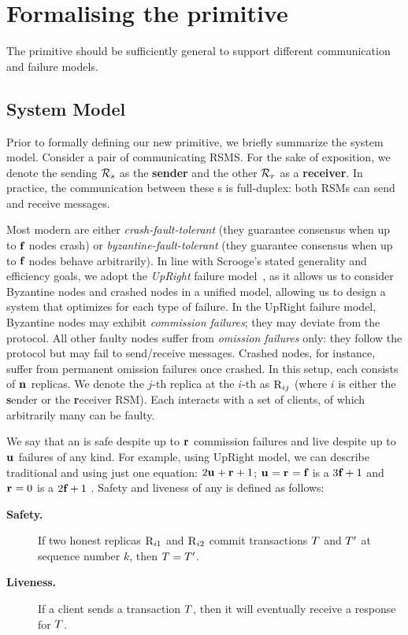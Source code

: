 \section{Formalising the \CCC{} primitive }
\label{s:prelim}
The \CCC{} primitive should be sufficiently general to support different communication and failure models. 

\subsection{System Model}

Prior to formally defining our new \CCC{} primitive, we briefly summarize the system model.
Consider a pair of communicating RSMS. For the sake of exposition,  we denote the sending \RSM{} $\mathcal{R}_{s}$ as the {\bf sender} and the other \RSM{} $\mathcal{R}_{r}$ as a {\bf receiver}. In practice, the communication between these \RSM{}s is full-duplex: both RSMs can send and receive messages.

Most modern  are either \textit{crash-fault-tolerant} (they guarantee consensus when up to $\textbf{f}_{}$ nodes crash) or \textit{byzantine-fault-tolerant} (they guarantee consensus when up to $\textbf{f}_{}$ nodes behave arbitrarily). In line with Scrooge's stated generality and efficiency goals, we adopt the \textit{UpRight} failure model~\cite{upright}, as it allows us to consider Byzantine nodes and crashed nodes in a unified model, allowing us to design a system that optimizes for each type of failure. In the UpRight failure model, Byzantine nodes may exhibit {\em commission failures}; they may deviate from the protocol. All other faulty nodes suffer from \textit{omission failures} only: they follow the protocol but may fail to send/receive messages. Crashed nodes, for instance, suffer from permanent omission failures once crashed.
In this setup, each \RSM{} consists of $\textbf{n}_{}$ replicas.  We denote the $j$-th replica at 
the $i$-th \RSM{} as $\textsc{R}_{{i}{j}}$ (where $i$ is either the \textbf{s}ender or the \textbf{r}eceiver RSM). Each \RSM{} interacts with a set of clients, of which arbitrarily many can be faulty.

We say that an \RSM{} is safe despite up to $\textbf{r}_{}$ commission failures and live despite up to $\textbf{u}_{}$ failures of any kind.
For example, using UpRight model, we can describe traditional \BFT{} and \CFT{}  using just one equation: $2\textbf{u}_{}+\textbf{r}_{}+1$; 
$\textbf{u}_{}=\textbf{r}_{}=\textbf{f}_{}$ is a $3\textbf{f}_{}+1$ \BFT{} and $\textbf{r}_{}=0$ is a $2\textbf{f}_{}+1$ \CFT{} \RSM{}.
%
Safety and liveness of any \RSM{} is defined as follows:
\begin{description}
\item[\bf Safety.]
If two honest replicas $\textsc{R}_{{i}{1}}$ and $\textsc{R}_{{i}{2}}$ commit transactions $\Transaction{}$ and $\Transaction{'}$
at sequence number $k$, then $\Transaction{} = \Transaction{'}$.

\item[\bf Liveness.]
If a client sends a transaction $\Transaction{}$, then it will eventually receive a response for $\Transaction{}$.
\end{description}

